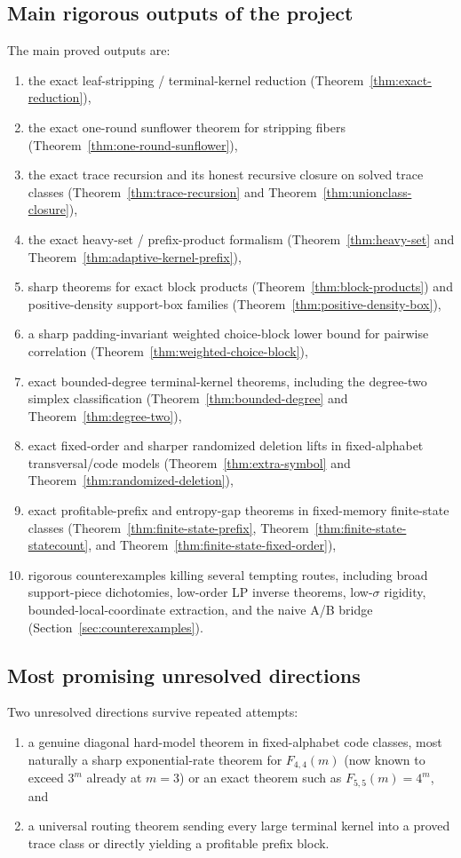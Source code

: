 \documentclass[11pt]{article}
\theoremstyle{definition}
\newcommand{\1}{\mathbf{1}}
\begin{document}
\subsection*{Main rigorous outputs of the project}
The main proved outputs are:
\begin{enumerate}[label=(\alph*),leftmargin=2.2em]
\item the exact leaf-stripping / terminal-kernel reduction (Theorem~\ref{thm:exact-reduction}),
\item the exact one-round sunflower theorem for stripping fibers (Theorem~\ref{thm:one-round-sunflower}),
\item the exact trace recursion and its honest recursive closure on solved trace classes (Theorem~\ref{thm:trace-recursion} and Theorem~\ref{thm:unionclass-closure}),
\item the exact heavy-set / prefix-product formalism (Theorem~\ref{thm:heavy-set} and Theorem~\ref{thm:adaptive-kernel-prefix}),
\item sharp theorems for exact block products (Theorem~\ref{thm:block-products}) and positive-density support-box families (Theorem~\ref{thm:positive-density-box}),
\item a sharp padding-invariant weighted choice-block lower bound for pairwise correlation (Theorem~\ref{thm:weighted-choice-block}),
\item exact bounded-degree terminal-kernel theorems, including the degree-two simplex classification (Theorem~\ref{thm:bounded-degree} and Theorem~\ref{thm:degree-two}),
\item exact fixed-order and sharper randomized deletion lifts in fixed-alphabet transversal/code models (Theorem~\ref{thm:extra-symbol} and Theorem~\ref{thm:randomized-deletion}),
\item exact profitable-prefix and entropy-gap theorems in fixed-memory finite-state classes (Theorem~\ref{thm:finite-state-prefix}, Theorem~\ref{thm:finite-state-statecount}, and Theorem~\ref{thm:finite-state-fixed-order}),
\item rigorous counterexamples killing several tempting routes, including broad support-piece dichotomies, low-order LP inverse theorems, low-$\sigma$ rigidity, bounded-local-coordinate extraction, and the naive A/B bridge (Section~\ref{sec:counterexamples}).
\end{enumerate}

\subsection*{Most promising unresolved directions}
Two unresolved directions survive repeated attempts:
\begin{enumerate}[label=(\roman*),leftmargin=2.2em]
\item a genuine diagonal hard-model theorem in fixed-alphabet code classes, most naturally a sharp exponential-rate theorem for $F_{4,4}(m)$ (now known to exceed $3^m$ already at $m=3$) or an exact theorem such as $F_{5,5}(m)=4^m$, and
\item a universal routing theorem sending every large terminal kernel into a proved trace class or directly yielding a profitable prefix block.
\end{enumerate}
\end{document}
